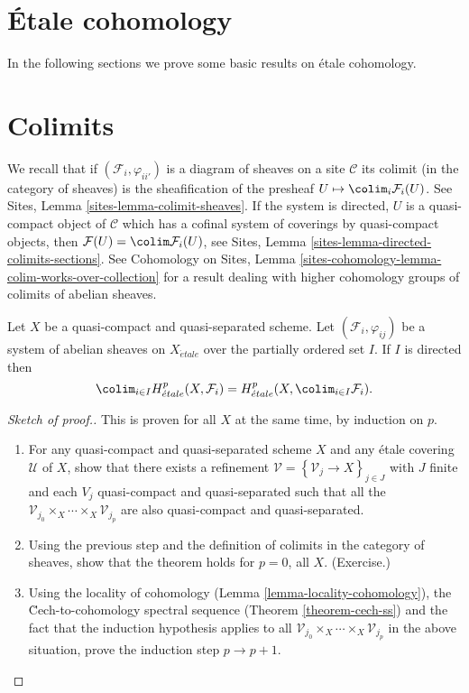 \section{\'Etale cohomology}
\label{section-etale-cohomology}

\noindent
In the following sections we prove some basic results on \'etale cohomology.


\section{Colimits}
\label{section-colimit}

\noindent
We recall that if $(\mathcal{F}_i, \varphi_{ii'})$
is a diagram of sheaves on a site $\mathcal{C}$ its colimit (in the
category of sheaves) is the sheafification of the presheaf
$U \mapsto \colim_i \mathcal{F}_i(U)$. See
Sites, Lemma \ref{sites-lemma-colimit-sheaves}.
If the system is directed, $U$ is a quasi-compact object of
$\mathcal{C}$ which has a cofinal system of coverings by quasi-compact
objects, then $\mathcal{F}(U) = \colim \mathcal{F}_i(U)$, see
Sites, Lemma \ref{sites-lemma-directed-colimits-sections}.
See Cohomology on Sites, Lemma
\ref{sites-cohomology-lemma-colim-works-over-collection}
for a result dealing with higher cohomology groups of colimits
of abelian sheaves.

\begin{theorem}
\label{theorem-colimit}
Let $X$ be a quasi-compact and quasi-separated scheme. Let
$\left(\mathcal{F}_i, \varphi_{ij}\right)$ be a system of abelian sheaves on
$X_{\acute{e}tale}$ over the partially ordered set $I$. If $I$ is directed then
$$
\colim_{i\in I} H_{\acute{e}tale}^p(X, \mathcal{F}_i) = H_{\acute{e}tale}^p(X,
\colim_{i\in I} \mathcal{F}_i).
$$
\end{theorem}

\begin{proof}[Sketch of proof.]
This is proven for all $X$ at the same time, by induction on $p$.
\begin{enumerate}
\item
For any quasi-compact and quasi-separated scheme $X$ and any \'etale covering
$\mathcal{U}$ of $X$, show that there exists a refinement $\mathcal{V}
=\left\{\mathcal{V}_j \to X\right\}_{j\in J}$ with $J$ finite and each $V_j$
quasi-compact and quasi-separated such that all the $\mathcal{V}_{j_0} \times_X
\cdots \times_X \mathcal{V}_{j_p}$ are also quasi-compact and quasi-separated.
\item
Using the previous step and the definition of colimits in the category of
sheaves, show that the theorem holds for $p=0$, all $X$. (Exercise.)
\item
Using the locality of cohomology
(Lemma \ref{lemma-locality-cohomology}),
the \u Cech-to-cohomology spectral sequence
(Theorem \ref{theorem-cech-ss}) and the fact that the induction
hypothesis applies to all $\mathcal{V}_{j_0} \times_X \cdots \times_X
\mathcal{V}_{j_p}$ in the above situation, prove the induction step $p\to p+1$.
\end{enumerate}
\end{proof}


